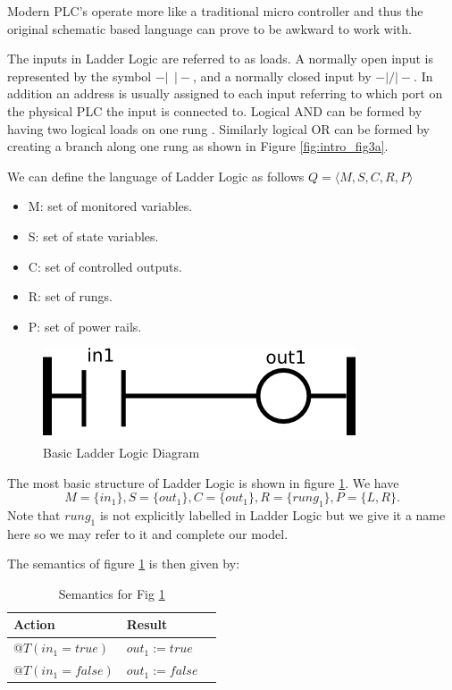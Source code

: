 Modern PLC's operate more like a traditional micro controller and thus the 
original schematic based language can prove to be awkward to work with.

The inputs in Ladder Logic are referred to as loads. A normally open input
is represented by the 
symbol $-\vert ~ ~ \vert-$, and a normally closed input by $-\vert/\vert-$.
In addition an address is usually assigned to each input referring to 
which port on the physical PLC the input is connected to. Logical AND 
can be formed by having two logical loads on one rung \cite{ebookmorris}. 
Similarly logical OR can be formed by creating a branch along one 
rung as shown in Figure \ref{fig:intro_fig3a}.

We can define the language of Ladder Logic as follows $Q = \langle M,S,C,R,P \rangle $

\begin{itemize}
	\item M: set of monitored variables.
	\item S: set of state variables.
	\item C: set of controlled outputs.
	\item R: set of rungs.
	\item P: set of power rails.
\end{itemize}

\begin{figure}[htp]
    \centering
    \includegraphics[width=\imgsmall]{./images/intro_fig1.png}
    \caption{Basic Ladder Logic Diagram}
    \label{fig:intro_fig1}
\end{figure}

The most basic structure of Ladder Logic is shown in figure \ref{fig:intro_fig1}. 
We have 
$$M=\lbrace in_1 \rbrace, S=\lbrace out_1 \rbrace, C=\lbrace out_1 \rbrace, R=\lbrace rung_1 \rbrace, P=\lbrace L,R \rbrace.$$
Note that $rung_1$ is not explicitly labelled in Ladder Logic but we give it a name here
so we may refer to it and complete our model.

\clearpage
The semantics of figure \ref{fig:intro_fig1} is then given by: 
\begin{table}[h]
    \centering
    \begin{tabular}{|l|l|l|}
        \hline
        Action & Result \\
        \hline
        $@T(in_1 = true)$ & $out_1 := true$ \\
        \hline
        $@T(in_1 = false)$ & $out_1 := false$ \\
        \hline
    \end{tabular}
    \caption{Semantics for Fig \ref{fig:intro_fig1}}
    \label{table:table_for_fig1}
\end{table}


